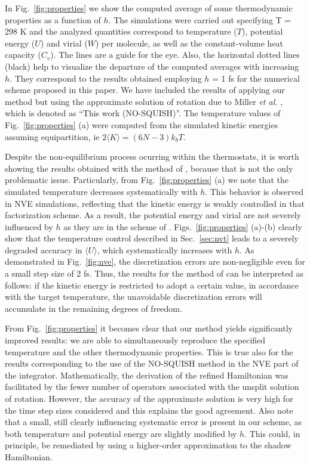 \documentclass[
journal=jctcce,
layout=twocolumn
]{achemso}
\newcommand{\timestep}{h}
\begin{document}
In Fig.~\ref{fig:properties} we show the computed average of some thermodynamic properties as a function of $h$. The simulations were carried out specifying T = 298 K and the analyzed quantities correspond to temperature ($T$), potential energy ($U$) and virial ($W$) per molecule, as well as the constant-volume heat capacity ($C_v$).
The lines are a guide for the eye. 
Also, the horizontal dotted lines (black) help to visualize the departure of the computed averages with increasing $\timestep$.
They correspond to the results obtained employing $h$ = 1 fs for the numerical scheme proposed in this paper.
We have included the results of applying our method but using the approximate solution of rotation due to Miller \textit{et al.} \cite{Miller_2002}, which is denoted as ``This work (NO-SQUISH)''.
The temperature values of Fig.~\ref{fig:properties} (a) were computed from the simulated kinetic energies assuming equipartition, ie $2 \langle K \rangle = (6N -3) k_b T$.

Despite the non-equilibrium process ocurring within the thermostats, it is worth showing the results obtained with the method of \citeauthor{Kamberaj_2005} \cite{Kamberaj_2005}, because that is not the only problematic issue.
Particularly, from Fig.~\ref{fig:properties} (a) we note that the simulated temperature decreases systematically with $\timestep$.
This behavior is observed in NVE simulations\cite{Davidchack_2009,Silveira_2017}, reflecting that the kinetic energy is weakly controlled in that factorization scheme.
As a result, the potential energy and virial are not severely influenced by $\timestep$ as they are in the scheme of \citeauthor{Martyna_1996} \cite{Martyna_1996}. Figs.~\ref{fig:properties} (a)-(b) clearly show that the temperature control described in Sec.~\ref{sec:nvt} leads to a severely degraded accuracy in $\langle U \rangle$, which systematically increases with $\timestep$.
As demonstrated in Fig.~\ref{fig:nve}, the discretization errors are non-negligible even for a small step size of 2 fs.
Thus, the results for the method of \citeauthor{Martyna_1996} \cite{Martyna_1996} can be interpreted as follows: if the kinetic energy is restricted to adopt a certain value, in accordance with the target temperature, the unavoidable discretization errors will accumulate in the remaining degrees of freedom.

From Fig.~\ref{fig:properties} it becomes clear that our method yields significantly improved results: we are able to simultaneously reproduce the specified temperature and the other thermodynamic properties. 
This is true also for the results corresponding to the use of the NO-SQUISH method\cite{Miller_2002} in the NVE part of the integrator.
Mathematically, the derivation of the refined Hamiltonian was facilitated by the fewer number of operators associated with the unsplit solution of rotation.
However, the accuracy of the approximate solution is very high for the time step sizes considered\cite{Silveira_2017} and this explains the good agreement.
Also note that a small, still clearly influencing systematic error is present in our scheme, as both temperature and potential energy are slightly modified by $h$. This could, in principle, be remediated by using a higher-order approximation to the shadow Hamiltonian. 
\end{document}
